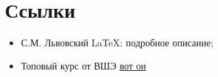 \documentclass[12pt]{article}
\begin{document}
\section{Ссылки}

\begin{itemize}
\item С.М. Львовский \LaTeX : подробное описание;
\item Топовый курс от ВШЭ \href{https://www.coursera.org/learn/latex}{вот он}
\end{itemize}
\end{document}
